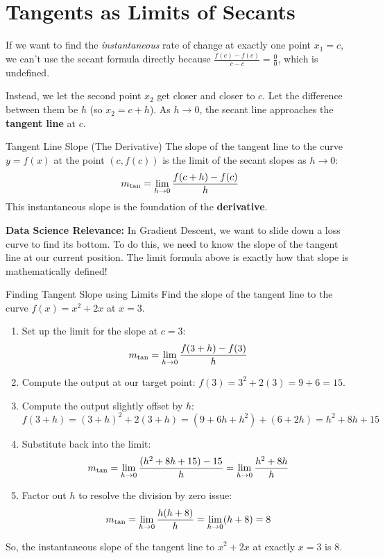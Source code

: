 \section{Tangents as Limits of Secants}

If we want to find the \textit{instantaneous} rate of change at exactly one point $x_1 = c$, we can't use the secant formula directly because $\frac{f(c) - f(c)}{c - c} = \frac{0}{0}$, which is undefined. 

Instead, we let the second point $x_2$ get closer and closer to $c$. Let the difference between them be $h$ (so $x_2 = c + h$). As $h \to 0$, the secant line approaches the \textbf{tangent line} at $c$.

\begin{definitionbox}{Tangent Line Slope (The Derivative)}
The slope of the tangent line to the curve $y = f(x)$ at the point $(c, f(c))$ is the limit of the secant slopes as $h \to 0$:
$$m_{\text{tan}} = \lim_{h \to 0} \frac{f(c + h) - f(c)}{h}$$
This instantaneous slope is the foundation of the \textbf{derivative}.
\end{definitionbox}

\textbf{Data Science Relevance:} In Gradient Descent, we want to slide down a loss curve to find its bottom. To do this, we need to know the slope of the tangent line at our current position. The limit formula above is exactly how that slope is mathematically defined!

\begin{examplebox}{Finding Tangent Slope using Limits}
Find the slope of the tangent line to the curve $f(x) = x^2 + 2x$ at $x = 3$.
\begin{enumerate}
    \item Set up the limit for the slope at $c = 3$:
    $$m_{\text{tan}} = \lim_{h \to 0} \frac{f(3+h) - f(3)}{h}$$
    \item Compute the output at our target point: $f(3) = 3^2 + 2(3) = 9 + 6 = 15$.
    \item Compute the output slightly offset by $h$:
    $$f(3+h) = (3+h)^2 + 2(3+h) = (9 + 6h + h^2) + (6 + 2h) = h^2 + 8h + 15$$
    \item Substitute back into the limit:
    $$m_{\text{tan}} = \lim_{h \to 0} \frac{(h^2 + 8h + 15) - 15}{h} = \lim_{h \to 0} \frac{h^2 + 8h}{h}$$
    \item Factor out $h$ to resolve the division by zero issue:
    $$m_{\text{tan}} = \lim_{h \to 0} \frac{h(h + 8)}{h} = \lim_{h \to 0} (h + 8) = 8$$
\end{enumerate}
So, the instantaneous slope of the tangent line to $x^2 + 2x$ at exactly $x=3$ is $8$.
\end{examplebox}

